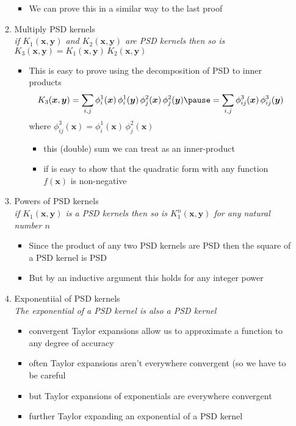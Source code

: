 \documentclass[11pt]{article}
\begin{document}
\begin{itemize}
\begin{enumerate}
\begin{itemize}
\item We can prove this in a similar way to the last proof
\end{itemize}
\item Multiply PSD kernels\\
\emph{if \(K_1(\bm{x},\bm{y})\) and \(K_2(\bm{x}, \bm{y})\) are PSD kernels then so is \(K_3(\bm{x}, \bm{y}) = K_1(\bm{x}, \bm{y}) \,K_2(\bm{x}, \bm{y})\)}
\begin{itemize}
\item This is easy to prove using the decomposition of PSD to
inner products
\begin{align*}
 K_3(\bm{x}, \bm{y})
 = \sum_{i,j} \phi_i^1(\bm{x})\,\phi_i^1(\bm{y})\,
      \phi_j^2(\bm{x})\,\phi_j^2(\bm{y}) \pause
 = \sum_{i,j} \phi_{ij}^3(\bm{x})\,\phi_{ij}^3(\bm{y})
 \end{align*}
where \(\phi_{ij}^3(\bm{x}) = \phi_i^1(\bm{x})\,\phi_j^2(\bm{x})\)
\begin{itemize}
\item this (double) sum we can treat as an inner-product
\item if is easy to show that the quadratic form with any
function \(f(\bm{x})\) is non-negative
\end{itemize}
\end{itemize}
\item Powers of PSD kernels\\
\emph{if \(K_1(\bm{x},\bm{y})\) is a PSD kernels then so is \(K_1^n(\bm{x},\bm{y})\) for any natural number \(n\)}
\begin{itemize}
\item Since the product of any two PSD kernels are PSD then the
square of a PSD kernel is PSD
\item But by an inductive argument this holds for any integer power
\end{itemize}
\item Exponentiial of PSD kernels\\
\emph{The exponential of a PSD kernel is also a PSD kernel}
\begin{itemize}
\item convergent Taylor expansions allow us to approximate a
function to any degree of accuracy
\item often Taylor expansions aren't everywhere convergent (so we
have to be careful
\item but Taylor expansions of exponentials are everywhere convergent
\item further Taylor expanding an exponential of a PSD kernel

\end{itemize}
\end{enumerate}
\end{itemize}
\end{document}
